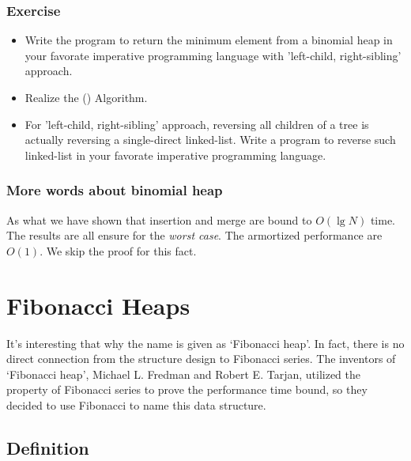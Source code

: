 \documentclass{article}
\begin{document}
\subsubsection*{Exercise}
\begin{itemize}
\item Write the program to return the minimum element from a
binomial heap in your favorate imperative programming language
with 'left-child, right-sibling' approach.

\item Realize the () Algorithm.

\item For 'left-child, right-sibling' approach, reversing all
children of a tree is actually reversing a single-direct linked-list.
Write a program to reverse such linked-list in your favorate
imperative programming language.
\end{itemize}

\subsubsection{More words about binomial heap}
As what we have shown that insertion and merge are bound to $O(\lg N)$
time. The results are all ensure for the {\em worst case}. The 
armortized performance are $O(1)$. We skip the proof for this
fact.

\section{Fibonacci Heaps}
\label{fib-heap}

It's interesting that why the name is given as `Fibonacci heap'.
In fact, there is no direct connection from the structure design
to Fibonacci series. The inventors of `Fibonacci heap', Michael L.
Fredman and Robert E. Tarjan, utilized the property of Fibonacci series
to prove the performance time bound, so they decided to use Fibonacci
to name this data structure.\cite{CLRS} 

\subsection{Definition}
\end{document}
